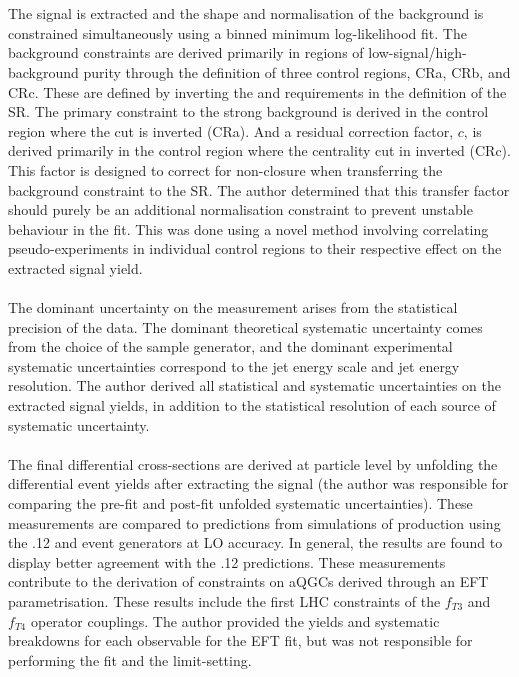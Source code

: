 \documentclass{thesissummary}
\begin{document}
\\\\
The signal is extracted and the shape and normalisation of the background is constrained simultaneously using a binned minimum log-likelihood fit. The background constraints are derived primarily in regions of low-signal/high-background purity through the definition of three control regions, CRa, CRb, and CRc. These are defined by inverting the \xily and \ngapjet requirements in the definition of the SR. The primary constraint to the strong background is derived in the control region where the \ngapjet cut is inverted (CRa). And a residual correction factor, $c$, is derived primarily in the control region where the centrality cut in inverted (CRc). This factor is designed to correct for non-closure when transferring the background constraint to the SR. The author determined that this transfer factor should purely be an additional normalisation constraint to prevent unstable behaviour in the fit. This was done using a novel method involving correlating pseudo-experiments in individual control regions to their respective effect on the extracted signal yield.
\\\\
The dominant uncertainty on the measurement arises from the statistical precision of the data. The dominant theoretical systematic uncertainty comes from the choice of the \qcdwy sample generator, and the dominant experimental systematic uncertainties correspond to the jet energy scale and jet energy resolution. The author derived all statistical and systematic uncertainties on the extracted signal yields, in addition to the statistical resolution of each source of systematic uncertainty.
\\\\
The final differential cross-sections are derived at particle level by unfolding the differential event yields after extracting the \ewwy signal (the author was responsible for comparing the pre-fit and post-fit unfolded systematic uncertainties). These measurements are compared to predictions from simulations of \ewwy production using the .12 and  event generators at LO accuracy. In general, the results are found to display better agreement with the .12 predictions. These measurements contribute to the derivation of constraints on aQGCs derived through an EFT parametrisation. These results include the first LHC constraints of the $f_{T3}$ and $f_{T4}$ operator couplings. The author provided the yields and systematic breakdowns for each observable for the EFT fit, but was not responsible for performing the fit and the limit-setting.
\end{document}
